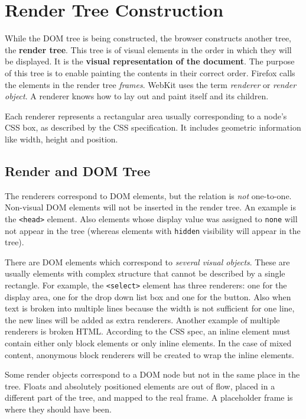 \documentclass[a4paper, justified, notoc]{tufte-handout} %
\begin{document}
\section{Render Tree Construction} %
\label{sec:render_tree_construction}
While the DOM tree is being constructed, the browser constructs another tree, the \textbf{render tree}. This tree is of visual elements in the order in which they will be displayed. It is the \textbf{visual representation of the document}. The purpose of this tree is to enable painting the contents in their correct order.
Firefox calls the elements in the render tree \emph{frames}. WebKit uses the term \emph{renderer} or \emph{render object}. 
A renderer knows how to lay out and paint itself and its children. 

Each renderer represents a rectangular area usually corresponding to a node's CSS box, as described by the CSS specification. It includes geometric information like width, height and position. 

\subsection{Render and DOM Tree} %
\label{sub:render_and_dom_tree}

The renderers correspond to DOM elements, but the relation is \emph{not} one-to-one. Non-visual DOM elements will not be inserted in the render tree. An example is the \texttt{<head>} element. Also elements whose display value was assigned to \texttt{none} will not appear in the tree (whereas elements with \texttt{hidden} visibility will appear in the tree).

There are DOM elements which correspond to \emph{several visual objects}. These are usually elements with complex structure that cannot be described by a single rectangle. For example, the \texttt{<select>} element has three renderers: one for the display area, one for the drop down list box and one for the button. Also when text is broken into multiple lines because the width is not sufficient for one line, the new lines will be added as extra renderers. 
Another example of multiple renderers is broken HTML. According to the CSS spec, an inline element must contain either only block elements or only inline elements. In the case of mixed content, anonymous block renderers will be created to wrap the inline elements.

Some render objects correspond to a DOM node but not in the same place in the tree. Floats and absolutely positioned elements are out of flow, placed in a different part of the tree, and mapped to the real frame. A placeholder frame is where they should have been.
\end{document}
